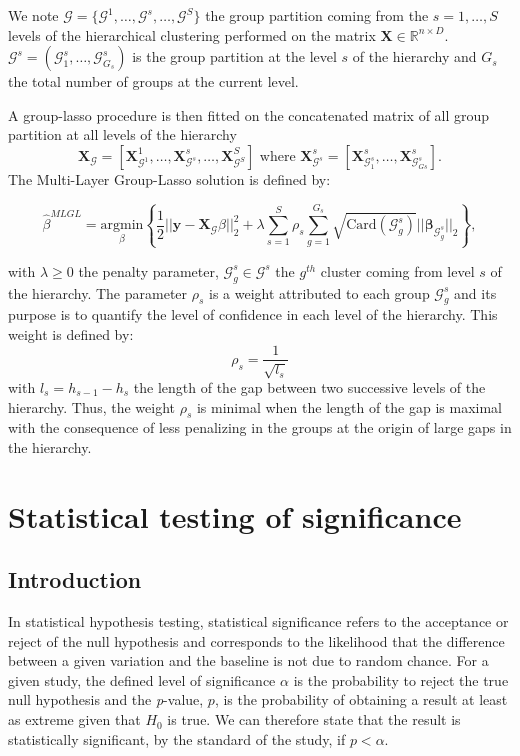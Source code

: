 \documentclass[]{book}
\begin{document}
We note
\(\mathcal{G} = \lbrace \mathcal{G}^1, \dots, \mathcal{G}^s, \dots, \mathcal{G}^S \rbrace\)
the group partition coming from the \(s= 1, \dots, S\) levels of the
hierarchical clustering performed on the matrix \(\mathbf{X} \in \mathbb{R}^{n \times D}\).
\(\mathcal{G}^s = (\mathcal{G}_1^s, \dots,\mathcal{G}^s_{G_s})\) is the group
partition at the level \(s\) of the hierarchy and \(G_s\) the total number
of groups at the current level.

A group-lasso procedure is then fitted on the concatenated matrix of all
group partition at all levels of the hierarchy
\[\mathbf{X}_{\mathcal{G}} = \left[ \mathbf{X}^1_{\mathcal{G}^1}, \dots, \mathbf{X}^s_{\mathcal{G}^s}, \dots, \mathbf{X}^S_{\mathcal{G}^S} \right] \text{ where } \mathbf{X}^s_{\mathcal{G}^s} = \left[ \mathbf{X}^s_{\mathcal{G}_1^s},\dots, \mathbf{X}^s_{\mathcal{G}_{Gs}^s} \right].\]
The Multi-Layer Group-Lasso solution is defined by:

\[\hat{\beta}^{MLGL} = \underset{\beta}{\text{argmin}} \left\lbrace \frac{1}{2} || \mathbf{y} - \mathbf{X}_{\mathcal{G}} \beta ||_2^2 + \lambda \sum_{s=1}^{S} \rho_s \sum_{g=1}^{G_s} \sqrt{\text{Card}(\mathcal{G}_g^s)} ||\boldsymbol{\beta}_{\mathcal{G}_g^s}||_2 \right\rbrace,
\label{eq:MLGL}\]

with \(\lambda \geqslant 0\) the penalty parameter,
\(\mathcal{G}_g^s \in \mathcal{G}^s\) the \(g^{th}\) cluster coming from level \(s\)
of the hierarchy. The parameter \(\rho_s\) is a weight attributed to each
group \(\mathcal{G}_g^s\) and its purpose is to quantify the level of
confidence in each level of the hierarchy. This weight is defined by:
\[\rho_s = \frac{1}{\sqrt{l_s}}\] with \(l_s = h_{s-1} - h_s\) the length
of the gap between two successive levels of the hierarchy. Thus, the
weight \(\rho_s\) is minimal when the length of the gap is maximal with
the consequence of less penalizing in the groups at the origin of large
gaps in the hierarchy.

\hypertarget{hypothesis}{%
\section{Statistical testing of significance}\label{hypothesis}}

\hypertarget{introduction-1}{%
\subsection{Introduction}\label{introduction-1}}

In statistical hypothesis testing, statistical significance refers to
the acceptance or reject of the null hypothesis and corresponds to the
likelihood that the difference between a given variation and the
baseline is not due to random chance. For a given study, the defined
level of significance \(\alpha\) is the probability to reject the true
null hypothesis and the \emph{p}-value, \(p\), is the probability of obtaining
a result at least as extreme given that \(H_0\) is true. We can therefore
state that the result is statistically significant, by the standard of
the study, if \(p < \alpha\).
\end{document}

